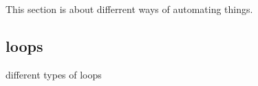 
This section is about differrent ways of automating things.

\subsection{loops}

different types of loops

